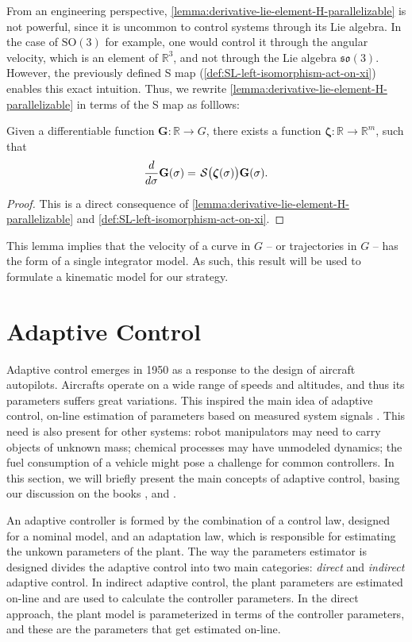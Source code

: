 From an engineering perspective, \cref{lemma:derivative-lie-element-H-parallelizable} is not powerful, since it is uncommon to control systems through its Lie algebra. In the case of $\text{SO}(3)$ for example, one would control it through the angular velocity, which is an element of $\mathbb{R}^3$, and not through the Lie algebra $\mathfrak{so}(3)$. However, the previously defined S map (\cref{def:SL-left-isomorphism-act-on-xi}) enables this exact intuition. Thus, we rewrite \cref{lemma:derivative-lie-element-H-parallelizable} in terms of the S map as folllows:
\begin{lemma} \label{lemma:very-important-fact}
    Given a differentiable function $\mathbf{\mathbf{G}}:\mathbb{R}\to G$, there exists a function $\boldsymbol{\zeta}:\mathbb{R}\to\mathbb{R}^m$, such that
    \begin{align}
    \label{eq:importantresult}
    \frac{d}{d\sigma} \mathbf{\mathbf{G}}(\sigma)=\SL\bigl(\boldsymbol{\zeta}(\sigma)\bigr)\mathbf{\mathbf{G}}(\sigma). 
\end{align}
\end{lemma}
\begin{proof} This is a direct consequence of \cref{lemma:derivative-lie-element-H-parallelizable} and \cref{def:SL-left-isomorphism-act-on-xi}. 
\end{proof}
This lemma implies that the velocity of a curve in $G$ -- or trajectories in $G$ -- has the form of a single integrator model. As such, this result will be used to formulate a kinematic model for our strategy.
\section{Adaptive Control}\label{sec:background-adaptive-control}
Adaptive control emerges in 1950 as a response to the design of aircraft autopilots. Aircrafts operate on a wide range of speeds and altitudes, and thus its parameters suffers great variations. This inspired the main idea of adaptive control, on-line estimation of parameters based on measured system signals \citep{Slotine1991}. This need is also present for other systems: robot manipulators may need to carry objects of unknown mass; chemical processes may have unmodeled dynamics; the fuel consumption of a vehicle might pose a challenge for common controllers. In this section, we will briefly present the main concepts of adaptive control, basing our discussion on the books \citet{Slotine1991}, \citet{Krstic1995} and \citet{Ioannou2012}.

An adaptive controller is formed by the combination of a control law, designed for a nominal model, and an adaptation law, which is responsible for estimating the unkown parameters of the plant. The way the parameters estimator is designed divides the adaptive control into two main categories: \emph{direct} and \emph{indirect} adaptive control. In indirect adaptive control, the plant parameters are estimated on-line and are used to calculate the controller parameters. In the direct approach, the plant model is parameterized in terms of the controller parameters, and these are the parameters that get estimated on-line.

